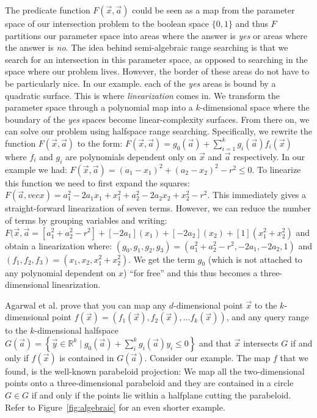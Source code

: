 \documentclass[UKenglish]{lipics-v2019}
\newcommand{\etal}{\textnormal{et al.}\xspace}
\begin{document}
The predicate function $F(\vec{x}, \vec{a})$ could be seen as a map from the parameter space of our intersection problem to the boolean space $\{0,1\}$ and thus $F$ partitions our parameter space into areas where the answer is \emph{yes} or areas where the answer is \emph{no}. The idea behind semi-algebraic range searching is that we search for an intersection in this parameter space, as opposed to searching in the space where our problem lives. However, the border of these areas do not have to be particularly nice. In our example. each of the \emph{yes} areas is bound by a quadratic surface. This is where \emph{linearization} comes in. We transform the parameter space through a polynomial map into a $k$-dimensional space where the boundary of the \emph{yes} spaces become linear-complexity surfaces. From there on, we can solve our problem using halfspace range searching. Specifically, we rewrite the function $F(\vec{x}, \vec{a})$ to the form: $F(\vec{x}, \vec{a}) =  g_0(\vec{a}) + \sum_{i=1}^k g_i(\vec{a})f_i(\vec{x})$ where $f_i$ and $g_i$ are polynomials dependent only on $\vec{x}$ and $\vec{a}$ respectively. In our example we had: $F(\vec{x}, \vec{a}) = (a_1 - x_1)^2 + (a_2 - x_2)^2 - r^2 \le 0$. To linearize this function we need to first expand the squares: $F(\vec{a}, vec{x}) = a_1^2 - 2 a_1 x_1 + x_1^2 + a_2^2 - 2 a_2 x_2 + x_2^2 - r^2$. This immediately gives a straight-forward linearization of seven terms. However, we can reduce the number of terms by grouping variables and writing: $F(\vec{x}, \vec{a} = [a_1^2 + a_2^2 - r^2] + [-2 a_1](x_1) + [-2 a_2](x_2) + [1](x_1^2 + x_2^2)$ and obtain a linearization where: $(g_0, g_1, g_2, g_3) = (a_1^2 + a_2^2 - r^2, -2a_1, -2a_2, 1)$ and $(f_1, f_2, f_3) = (x_1, x_2, x_1^2 + x_2^2)$. We get the term $g_0$ (which is not attached to any polynomial dependent on $x$) ``for free'' and this thus becomes a three-dimensional linearization.

Agarwal \etal prove that you can map any $d$-dimensional point $\vec{x}$ to the $k$-dimensional point $f(\vec{x}) = (f_1(\vec{x}), f_2(\vec{x}), \dots f_k(\vec{x}))$, and any query range to the $k$-dimensional halfspace $G(\vec{a}) = \left\{ \vec{y} \in \mathbb{R}^k \mid g_0(\vec{a})  + \sum_i^k g_i(\vec{a})y_i  \le 0 \right\}$ and that $\vec{x}$ intersects $G$ if and only if $f(\vec{x})$ is contained in $G(\vec{a})$. 
Consider our example. The map $f$ that we found, is the well-known parabeloid projection: We map all the two-dimensional points onto a three-dimensional parabeloid and they are contained in a circle $G \in G$ if and only if the points lie within a halfplane cutting the parabeloid.  Refer to Figure~\ref{fig:algebraic} for an even shorter example.
\end{document}
